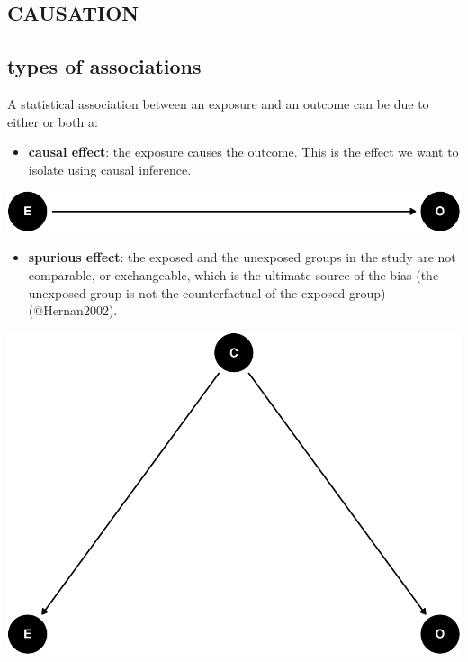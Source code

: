 \documentclass[
]{article}
\providecommand{\tightlist}{%
  \setlength{\itemsep}{0pt}\setlength{\parskip}{0pt}}
\begin{document}
\hypertarget{causation}{%
\subsection{\texorpdfstring{\textbf{CAUSATION}}{CAUSATION}}\label{causation}}

\hypertarget{types-of-associations}{%
\subsection{types of associations}\label{types-of-associations}}

A statistical association between an exposure and an outcome can be due
to either or both a:

\begin{itemize}
\tightlist
\item
  \textbf{causal effect}: the exposure causes the outcome. This is the
  effect we want to isolate using causal inference.
\end{itemize}

\includegraphics{index_files/figure-latex/dag causal 1-1.pdf}

\begin{itemize}
\tightlist
\item
  \textbf{spurious effect}: the exposed and the unexposed groups in the
  study are not comparable, or exchangeable, which is the ultimate
  source of the bias (the unexposed group is not the counterfactual of
  the exposed group) (@Hernan2002).
\end{itemize}

\includegraphics{index_files/figure-latex/dag spurious 1-1.pdf}
\end{document}

